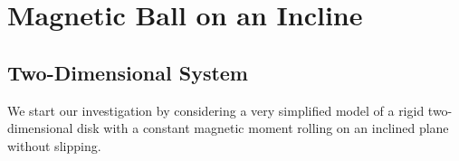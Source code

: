 \chapter{Magnetic Ball on an Incline}
\label{chap:incline}
\vspace*{-0.9cm}


\section{Two-Dimensional System}
\label{sec:twodim}

We start our investigation by considering a very simplified model of a rigid two-dimensional disk with a constant magnetic moment rolling on an inclined plane without slipping.

